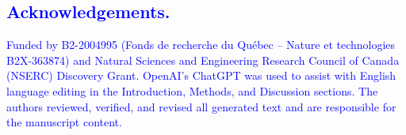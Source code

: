 \documentclass[runningheads]{llncs}
\newcommand{\revisiontext}[1]{\textcolor{blue}{#1}}
\begin{document}
\subsection*{\revisiontext{Acknowledgements.}}
\revisiontext{Funded by B2-2004995 (Fonds de recherche du Qu\'ebec – Nature et technologies B2X-363874) and Natural Sciences and Engineering Research Council of Canada (NSERC) Discovery Grant. OpenAI's ChatGPT was used to assist with English language editing in the Introduction, Methods, and Discussion sections. The authors reviewed, verified, and revised all generated text and are responsible for the manuscript content.}

\clearpage


\end{document}
